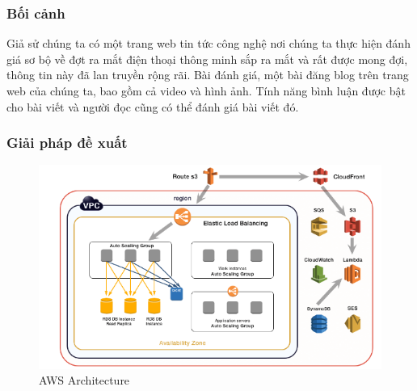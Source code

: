 \subsubsection{Bối cảnh}
Giả sử chúng ta có một trang web tin tức công nghệ nơi chúng ta thực hiện đánh giá sơ bộ về đợt ra mắt điện thoại thông minh sắp ra mắt và rất được mong đợi, thông tin này đã lan truyền rộng rãi. Bài đánh giá, một bài đăng blog trên trang web của chúng ta, bao gồm cả video và hình ảnh. Tính năng bình luận được bật cho bài viết và người đọc cũng có thể đánh giá bài viết đó. 
\subsubsection{Giải pháp đề xuất}
\begin{figure}[H]
    \begin{center}
    \includegraphics[scale=1]{images/hieu/chap-2/aws-architecture.png}
    \vspace*{5mm}
    \caption{AWS Architecture}
    \end{center}
\end{figure} 
